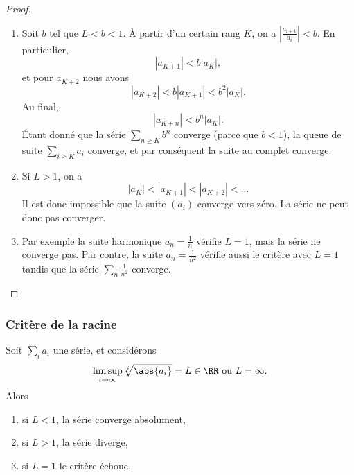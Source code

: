\begin{proof}
\begin{enumerate}
    \item
        Soit $b$ tel que $L<b<1$. À partir d'un certain rang $K$, on a $\left| \frac{ a_{i+1} }{ a_i } \right| <b$. En particulier,
        \begin{equation}
            | a_{K+1} |<b| a_K |,
        \end{equation}
        et pour $a_{K+2}$ nous avons
        \begin{equation}
            | a_{K+2} |<b| a_{K+1} |<b^2| a_K |.
        \end{equation}
        Au final,
        \begin{equation}
            | a_{K+n} |<b^n| a_K |.
        \end{equation}
        Étant donné que la série $\sum_{n\geq K}b^n$ converge (parce que $b<1$), la queue de suite $\sum_{i\geq K}a_i$ converge, et par conséquent la suite au complet converge.
    \item
        Si $L>1$, on a
        \begin{equation}
            | a_K |<| a_{K+1} |<| a_{K+2} |<\ldots
        \end{equation}
        Il est donc impossible que la suite $(a_i)$ converge vers zéro. La série ne peut donc pas converger.
    \item
        Par exemple la suite harmonique $a_n=\frac{1}{ n }$ vérifie $L=1$, mais la série ne converge pas. Par contre, la suite $a_n=\frac{ 1 }{ n^2 }$ vérifie aussi le critère avec $L=1$ tandis que la série $\sum_n\frac{1}{ n^2 }$ converge.
\end{enumerate}
\end{proof}

\subsubsection{Critère de la racine}

\begin{proposition}
    Soit $\sum_i a_i$ une série, et considérons
    \begin{equation*}
      \limsup_{i \rightarrow \infty} \sqrt[i]{\abs{a_i}} = L \in \RR
      \text{ ou $L =
        \infty$.}
    \end{equation*}
    Alors
    \begin{enumerate}
    \item si $L < 1$, la série converge absolument,
    \item si $L> 1$, la série diverge,
    \item si $L = 1$ le critère échoue.
    \end{enumerate}
\end{proposition}

